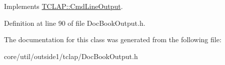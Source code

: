 Implements \hyperlink{classTCLAP_1_1CmdLineOutput_ae052fea473132482296de55edb3dd480}{T\+C\+L\+A\+P\+::\+Cmd\+Line\+Output}.



Definition at line 90 of file Doc\+Book\+Output.\+h.



The documentation for this class was generated from the following file\+:\begin{DoxyCompactItemize}
\item 
core/util/outside1/tclap/Doc\+Book\+Output.\+h\end{DoxyCompactItemize}
